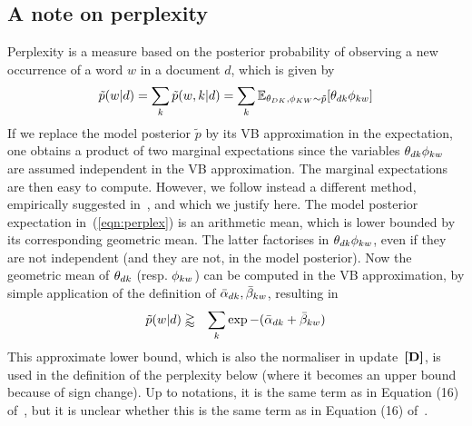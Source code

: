 \subsection{A note on perplexity}
Perplexity is a measure based on the posterior probability of observing a new occurrence of a word $w$ in a document $d$, which is given by
\begin{equation}
\label{eqn:perplex}
\tilde{p}(w|d) =
\sum_k\tilde{p}(w,k|d) =
\sum_k\mathbb{E}_{\theta_{DK},\phi_{KW}\sim\tilde{p}}[\theta_{dk}\phi_{kw}]
\end{equation}
If we replace the model posterior $\tilde{p}$ by its VB approximation in the expectation, one obtains a product of two marginal expectations since the variables $\theta_{dk}\phi_{kw}$ are assumed independent in the VB approximation. The marginal expectations are then easy to compute. However, we follow instead a different method, empirically suggested in~\cite{asuncion_smoothing_2009}, and which we justify here. The model posterior expectation in~(\ref{eqn:perplex}) is an arithmetic mean, which is lower bounded by its corresponding geometric mean. The latter factorises in $\theta_{dk}\phi_{kw}$, even if they are not independent (and they are not, in the model posterior). Now the geometric mean of $\theta_{dk}$ (resp. $\phi_{kw}$) can be computed in the VB approximation, by simple application of the definition of $\bar{\alpha}_{dk},\bar{\beta}_{kw}$, resulting in
\begin{eqnarray}
\label{eqn:perplex-bound}
\tilde{p}(w|d) & \gtrapprox & \sum_k\exp-(\bar{\alpha}_{dk}+\bar{\beta}_{kw})
\end{eqnarray}
This approximate lower bound, which is also the normaliser in update~$\textbf{[D]}$, is used in the definition of the perplexity below (where it becomes an upper bound because of sign change). Up to notations, it is the same term as in Equation (16) of~\cite{asuncion_smoothing_2009}, but it is unclear whether this is the same term as in Equation (16) of~\cite{hoffman_online_2010}.
